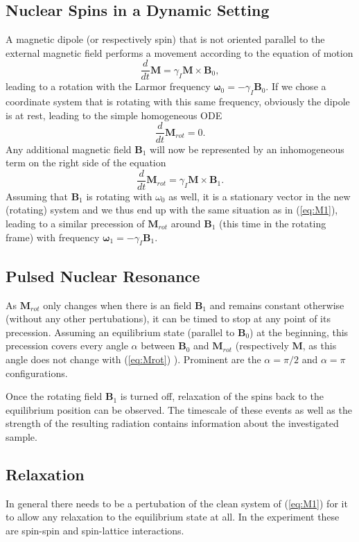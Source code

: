 \documentclass[a4paper]{scrartcl}
\numberwithin{equation}{section}
\numberwithin{figure}{section}
\numberwithin{table}{section}
\newcommand{\eq}[2]{\begin{equation}#1\label{#2}\end{equation}}
\newcommand{\ve}[1]{\mathbf{ #1} }
\begin{document}
\subsection{Nuclear Spins in a Dynamic Setting}
A magnetic dipole (or respectively spin) that is not oriented parallel to the external magnetic field performs a movement according to the equation of motion
\eq{\frac{d}{dt}\ve M = \gamma_I \ve M \times \ve B_0 ,}{eq:M1}
leading to a rotation with the Larmor frequency $\ve \omega_0 = -\gamma_I \ve B_0$. If we chose a coordinate system that is rotating with this same frequency, obviously the dipole is at rest, leading to the simple homogeneous ODE
\eq{\frac{d}{dt}\ve M_{rot} = 0.}{eq:Mrot}
Any additional magnetic field $\ve B_1$ will now be represented by an inhomogeneous term on the right side of the equation
\eq{\frac{d}{dt}\ve M_{rot} = \gamma_I \ve M \times \ve B_1.}{}
Assuming that $\ve B_1$ is rotating with $\omega_0$ as well, it is a stationary vector in the new (rotating) system and we thus end up with the same situation as in (\ref{eq:M1}), leading to a similar precession of $\ve M_{rot}$ around $\ve B_1$ (this time in the rotating frame) with frequency $\ve \omega_1 = -\gamma_I \ve B_1$.


\subsection{Pulsed Nuclear Resonance}
As $\ve M_{rot}$ only changes when there is an field $\ve B_1$ and remains constant otherwise (without any other pertubations), it can be timed to stop at any point of its precession. Assuming an equilibrium state (parallel to $\ve B_0$) at the beginning, this precession covers every angle $\alpha$ between $\ve B_0$ and $\ve M_{rot}$ (respectively $\ve M$, as this angle does not change with (\ref{eq:Mrot}) ). Prominent are the $\alpha = \pi/2$ and $\alpha = \pi$ configurations.

Once the rotating field $\ve B_1$ is turned off, relaxation of the spins back to the equilibrium position can be observed. The timescale of these events as well as the strength of the resulting radiation contains information about the investigated sample.


\subsection{Relaxation}
In general there needs to be a pertubation of the clean system of (\ref{eq:M1}) for it to allow any relaxation to the equilibrium state at all. In the experiment these are spin-spin and spin-lattice interactions.
\end{document}
